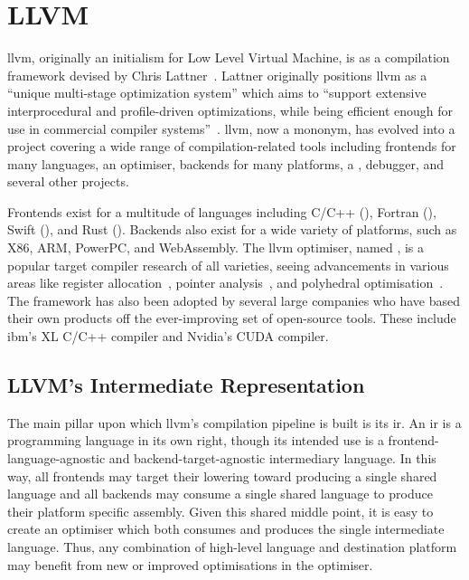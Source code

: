 \documentclass[\main/thesis.tex]{subfiles}
\begin{document}
\section{LLVM}
\label{sec:llvm}
\Gls{llvm}, originally an initialism for Low Level Virtual Machine, is as a compilation framework devised by Chris Lattner~\autocite{lattner2002llvm,lattner2004llvm}.
Lattner originally positions \gls{llvm} as a ``unique multi-stage optimization system'' which aims to ``support extensive interprocedural and profile-driven optimizations, while being efficient enough for use in commercial compiler systems''~\autocite{lattner2002llvm}.
\Gls{llvm}, now a mononym, has evolved into a project covering a wide range of compilation-related tools including frontends for many languages, an optimiser, backends for many platforms, a , debugger, and several other projects.

Frontends exist for a multitude of languages including C/C++ (), Fortran (), Swift (), and Rust ().
Backends also exist for a wide variety of platforms, such as X86, ARM, PowerPC, and WebAssembly.
The \gls{llvm} optimiser, named , is a popular target compiler research of all varieties, seeing advancements in various areas like register allocation~\autocite{lozano2019combinatorial,pereira2008register}, pointer analysis~\autocite{hardekopf2009semi,sui2016interprocedural}, and polyhedral optimisation~\autocite{grosser2011polly,alves2015runtime}.
The framework has also been adopted by several large companies who have based their own products off the ever-improving set of open-source tools.
These include \gls{ibm}'s XL C/C++ compiler and Nvidia's CUDA compiler.

\subsection{LLVM's Intermediate Representation}
\label{sec:ir}
The main pillar upon which \gls{llvm}'s compilation pipeline is built is its \gls{ir}.
An \gls{ir} is a programming language in its own right, though its intended use is a frontend-language-agnostic and backend-target-agnostic intermediary language.
In this way, all frontends may target their \gls{lowering} toward producing a single shared language and all backends may consume a single shared language to produce their platform specific assembly.
Given this shared middle point, it is easy to create an optimiser which both consumes and produces the single intermediate language.
Thus, any combination of high-level language and destination platform may benefit from new or improved optimisations in the optimiser.
\end{document}
